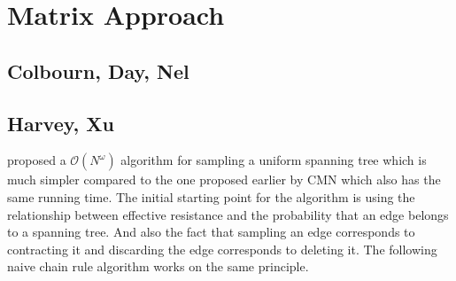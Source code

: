 

\newcommand{\laplacian}[1][G]{\ensuremath{L_{#1}^{+}}}
\newcommand{\reffformula}[1][\laplacian]{\ensuremath{ (\chi_u - \chi_v)^T \  #1 \ (\chi_u - \chi_v) }}
\newcommand{\reff}[1][e]{\ensuremath{R_#1^{\text{eff}}}}
\newcommand{\proj}{\ensuremath{I - \frac{\textbf{1} \textbf{1}^T}{n}}}
\newcommand{\sqlaplacian}[1][G]{\ensuremath{\sqrt{L_{#1}^{+}}}}
\newcommand{\Mset}[2]{\ensuremath{\mathbb{M}_{#1 \times #2}}}

\newcommand\norm[1]{\left\lVert#1\right\rVert}
%  



\newcommand{\Lim}[1]{\raisebox{0.5ex}{\scalebox{0.8}{$\displaystyle \lim_{#1}\;$}}}

\chapter{Matrix Approach} %

\label{Chapter4} %

\section{Colbourn, Day, Nel}

\section{Harvey, Xu}

\cite{harvey2016generating} proposed a $\mathcal{O}(N^\omega)$ algorithm for sampling a uniform spanning tree which is much simpler compared to the one proposed earlier by CMN which also has the same running time. The initial starting point for the algorithm is using the relationship between effective resistance and the probability that an edge belongs to a spanning tree. And also the fact that sampling an edge corresponds to contracting it and discarding the edge corresponds to deleting it. The following naive chain rule algorithm works on the same principle. 




